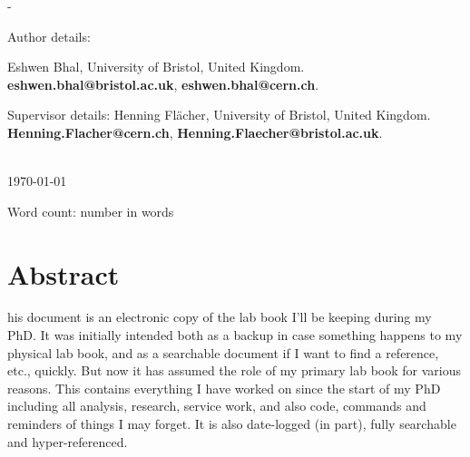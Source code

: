 \documentclass[a4paper,12pt,leqno,openbib,oldfontcommands,oneside]{memoir} %
\begin{document}
\begin{titlingpage}
\begin{SingleSpace}
\begin{adjustwidth*}{\unitlength}{-\unitlength}
\begin{center}
\begin{minipage}{10cm}
  Author details:
  
  Eshwen Bhal, University of Bristol, United Kingdom. \textbf{eshwen.bhal@bristol.ac.uk}, \textbf{eshwen.bhal@cern.ch}.
       
  Supervisor details: Henning Fl\"{a}cher, University of Bristol, United Kingdom. \textbf{Henning.Flacher@cern.ch}, \textbf{Henning.Flaecher@bristol.ac.uk}.
  \end{minipage}\\
  \vspace{9mm}
  {\large\textsc{\today}}  %
  \vspace{12mm}
  \end{center}
  \begin{flushright}
  {\small Word count: number in words}  %
  \end{flushright}
  \end{adjustwidth*}
  \end{SingleSpace}
\end{titlingpage}

\chapter*{Abstract}
\begin{SingleSpace}
his document is an electronic copy of the lab book I'll be keeping during my PhD. It was initially intended both as a backup in case something happens to my physical lab book, and as a searchable document if I want to find a reference, etc., quickly. But now it has assumed the role of my primary lab book for various reasons. This contains everything I have worked on since the start of my PhD including all analysis, research, service work, and also code, commands and reminders of things I may forget. It is also date-logged (in part), fully searchable and hyper-referenced.
\end{SingleSpace}
\clearpage

\renewcommand{\contentsname}{Table of Contents}
\tableofcontents*
{}
\clearpage

\listoffigures
{}
\clearpage

\listoftables
{}
\clearpage
\end{document}
